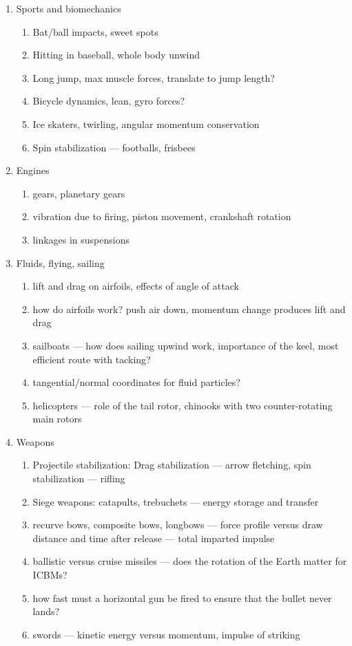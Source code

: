 \documentclass{article}
\begin{document}
\begin{enumerate}
\item Sports and biomechanics
  \begin{enumerate}
  \item Bat/ball impacts, sweet spots
  \item Hitting in baseball, whole body unwind
  \item Long jump, max muscle forces, translate to jump length?
  \item Bicycle dynamics, lean, gyro forces?
  \item Ice skaters, twirling, angular momentum conservation
  \item Spin stabilization --- footballs, frisbees
  \end{enumerate}
\item Engines
  \begin{enumerate}
  \item gears, planetary gears
  \item vibration due to firing, piston movement, crankshaft rotation
  \item linkages in suspensions
  \end{enumerate}
\item Fluids, flying, sailing
  \begin{enumerate}
  \item lift and drag on airfoils, effects of angle of attack
  \item how do airfoils work? push air down, momentum change produces
    lift and drag
  \item sailboats --- how does sailing upwind work, importance of the
    keel, most efficient route with tacking?
  \item tangential/normal coordinates for fluid particles?
  \item helicopters --- role of the tail rotor, chinooks with two
    counter-rotating main rotors
  \end{enumerate}
\item Weapons
  \begin{enumerate}
  \item Projectile stabilization: Drag stabilization --- arrow
    fletching, spin stabilization --- rifling
  \item Siege weapons: catapults, trebuchets --- energy storage and
    transfer
  \item recurve bows, composite bows, longbows --- force profile
    versus draw distance and time after release --- total imparted
    impulse
  \item ballistic versus cruise missiles --- does the rotation of the
    Earth matter for ICBMs?
  \item how fast must a horizontal gun be fired to ensure that the
    bullet never lands?
  \item swords --- kinetic energy versus momentum, impulse of striking
  \end{enumerate}
\end{enumerate}
\end{document}
